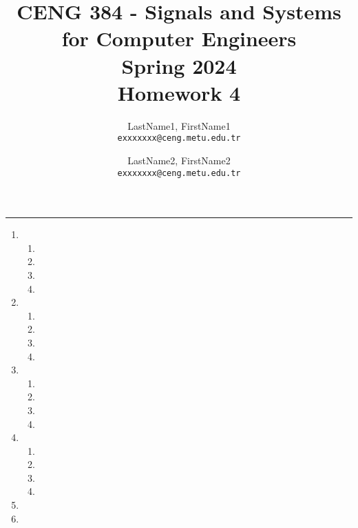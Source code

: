 \documentclass[10pt,a4paper, margin=1in]{article}
\author{
  LastName1, FirstName1\\
  \texttt{exxxxxxx@ceng.metu.edu.tr}
  \and
  LastName2, FirstName2\\
  \texttt{exxxxxxx@ceng.metu.edu.tr}
}
\title{CENG 384 - Signals and Systems for Computer Engineers \\
Spring 2024 \\
Homework 4}
\begin{document}
\maketitle



\noindent\rule{19cm}{1.2pt}

\begin{enumerate}

\item %
	\begin{enumerate}
    \item %
    \item %
	\item %
	\item %
    \end{enumerate}

\item %
	\begin{enumerate}
    \item %
    \item %
	\item %
	\item %
    \end{enumerate}

\item %
    \begin{enumerate}
    \item %
    \item %
	\item %
	\item %
    \end{enumerate}

\item %
	\begin{enumerate}
    \item %
    \item %
	\item %
	\item %
    \end{enumerate}

\item %
    
\item %

\end{enumerate}
\end{document}

